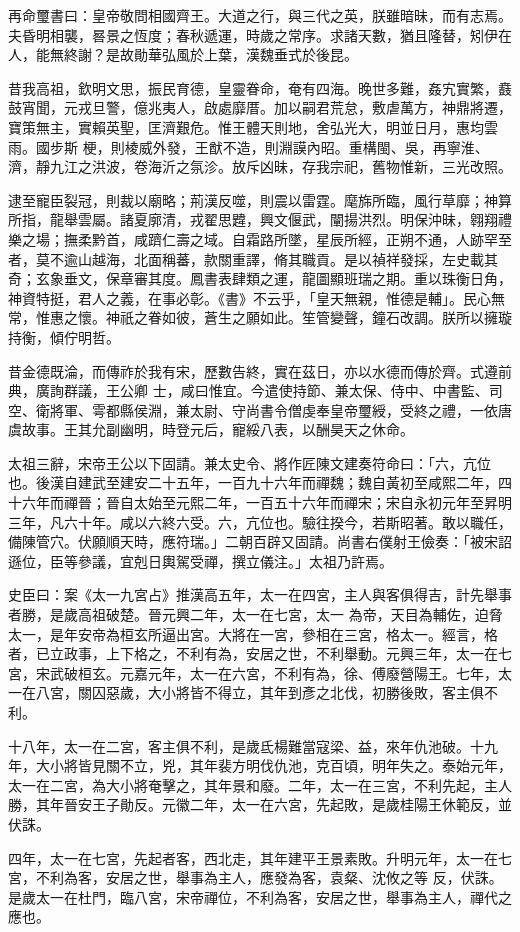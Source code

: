 \begin{pinyinscope}
 再命璽書曰：皇帝敬問相國齊王。大道之行，與三代之英，朕雖暗昧，而有志焉。夫昏明相襲，晷景之恆度；春秋遞運，時歲之常序。求諸天數，猶且隆替，矧伊在人，能無終謝？是故勛華弘風於上葉，漢魏垂式於後昆。



 昔我高祖，欽明文思，振民育德，皇靈眷命，奄有四海。晚世多難，姦宄實繁，鼖鼓宵聞，元戎旦警，億兆夷人，啟處靡厝。加以嗣君荒怠，敷虐萬方，神鼎將遷，寶策無主，實賴英聖，匡濟艱危。惟王體天則地，舍弘光大，明並日月，惠均雲雨。國步斯
 梗，則棱威外發，王猷不造，則淵謨內昭。重構閩、吳，再寧淮、濟，靜九江之洪波，卷海沂之氛沴。放斥凶昧，存我宗祀，舊物惟新，三光改照。



 逮至寵臣裂冠，則裁以廟略；荊漢反噬，則震以雷霆。麾旆所臨，風行草靡；神算所指，龍舉雲屬。諸夏廓清，戎翟思韙，興文偃武，闡揚洪烈。明保沖昧，翱翔禮樂之場；撫柔黔首，咸躋仁壽之域。自霜路所墜，星辰所經，正朔不通，人跡罕至者，莫不逾山越海，北面稱蕃，款關重譯，脩其職貢。是以禎祥發採，左史載其奇；玄象垂文，保章審其度。鳳書表肆類之運，龍圖顯班瑞之期。重以珠衡日角，神資特挺，君人之義，在事必彰。《書》不云乎，「皇天無親，惟德是輔」。民心無常，惟惠之懷。神祇之眷如彼，蒼生之願如此。笙管變聲，鐘石改調。朕所以擁璇持衡，傾佇明哲。



 昔金德既淪，而傳祚於我有宋，歷數告終，實在茲日，亦以水德而傳於齊。式遵前典，廣詢群議，王公卿
 士，咸曰惟宜。今遣使持節、兼太保、侍中、中書監、司空、衛將軍、雩都縣侯淵，兼太尉、守尚書令僧虔奉皇帝璽綬，受終之禮，一依唐虞故事。王其允副幽明，時登元后，寵綏八表，以酬昊天之休命。



 太祖三辭，宋帝王公以下固請。兼太史令、將作匠陳文建奏符命曰：「六，亢位也。後漢自建武至建安二十五年，一百九十六年而禪魏；魏自黃初至咸熙二年，四十六年而禪晉；晉自太始至元熙二年，一百五十六年而禪宋；宋自永初元年至昇明三年，凡六十年。咸以六終六受。六，亢位也。驗往揆今，若斯昭著。敢以職任，備陳管穴。伏願順天時，應符瑞。」二朝百辟又固請。尚書右僕射王儉奏：「被宋詔遜位，臣等參議，宜剋日輿駕受禪，撰立儀注。」太祖乃許焉。



 史臣曰：案《太一九宮占》推漢高五年，太一在四宮，主人與客俱得吉，計先舉事者勝，是歲高祖破楚。晉元興二年，太一在七宮，太一
 為帝，天目為輔佐，迫脅太一，是年安帝為桓玄所逼出宮。大將在一宮，參相在三宮，格太一。經言，格者，已立政事，上下格之，不利有為，安居之世，不利舉動。元興三年，太一在七宮，宋武破桓玄。元嘉元年，太一在六宮，不利有為，徐、傅廢營陽王。七年，太一在八宮，關囚惡歲，大小將皆不得立，其年到彥之北伐，初勝後敗，客主俱不利。



 十八年，太一在二宮，客主俱不利，是歲氐楊難當寇梁、益，來年仇池破。十九年，大小將皆見關不立，兇，其年裴方明伐仇池，克百頃，明年失之。泰始元年，太一在二宮，為大小將奄擊之，其年景和廢。二年，太一在三宮，不利先起，主人勝，其年晉安王子勛反。元徽二年，太一在六宮，先起敗，是歲桂陽王休範反，並伏誅。



 四年，太一在七宮，先起者客，西北走，其年建平王景素敗。升明元年，太一在七宮，不利為客，安居之世，舉事為主人，應發為客，袁粲、沈攸之等
 反，伏誅。是歲太一在杜門，臨八宮，宋帝禪位，不利為客，安居之世，舉事為主人，禪代之應也。



\end{pinyinscope}